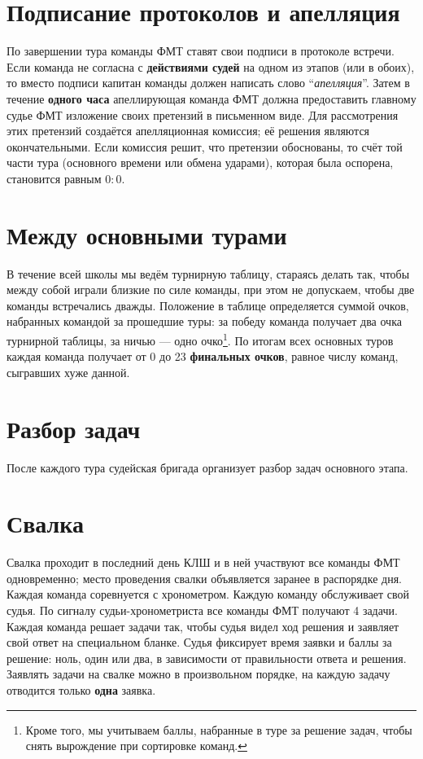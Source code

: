 \documentclass[12pt,a4paper]{article}
\begin{document}
\section{Подписание протоколов и апелляция}
По завершении тура команды ФМТ ставят свои подписи в протоколе встречи. Если команда не согласна с {\bf действиями судей} на одном из этапов (или в обоих), то вместо подписи капитан команды должен написать слово ``\textsl{апелляция}''. Затем в течение {\bf одного часа} апеллирующая команда ФМТ должна предоставить главному судье ФМТ изложение своих претензий в письменном виде. Для рассмотрения этих претензий создаётся апелляционная комиссия; её решения являются окончательными. Если комиссия решит, что претензии обоснованы, то счёт той части тура (основного времени или обмена ударами), которая была оспорена, становится равным $0:0$.

\section{Между основными турами}
В течение всей школы мы ведём турнирную таблицу, стараясь делать так, чтобы между собой играли близкие по силе команды, при этом не допускаем, чтобы две команды встречались дважды. Положение в таблице определяется суммой очков, набранных командой за прошедшие туры: за победу команда получает два очка турнирной таблицы, за ничью --- одно очко\footnote{Кроме того, мы учитываем баллы, набранные в туре за решение задач, чтобы снять вырождение при сортировке команд.}. По итогам всех основных туров каждая команда получает от 0 до 23 {\bf финальных очков}, равное числу команд, сыгравших хуже данной.

\section{Разбор задач}
После каждого тура судейская бригада организует разбор задач основного этапа.

\section{Свалка}
Свалка проходит в последний день КЛШ и в ней участвуют все команды ФМТ одновременно; место проведения свалки объявляется заранее в распорядке дня. Каждая команда соревнуется с хронометром. Каждую команду обслуживает свой судья. По сигналу судьи-хронометриста все команды ФМТ получают 4 задачи. Каждая команда решает задачи так, чтобы судья видел ход решения и заявляет свой ответ на специальном бланке. Судья фиксирует время заявки и баллы за решение: ноль, один или два, в зависимости от правильности ответа и решения. Заявлять задачи на свалке можно в произвольном порядке, на каждую задачу отводится только \textbf{одна} заявка.
\end{document}
